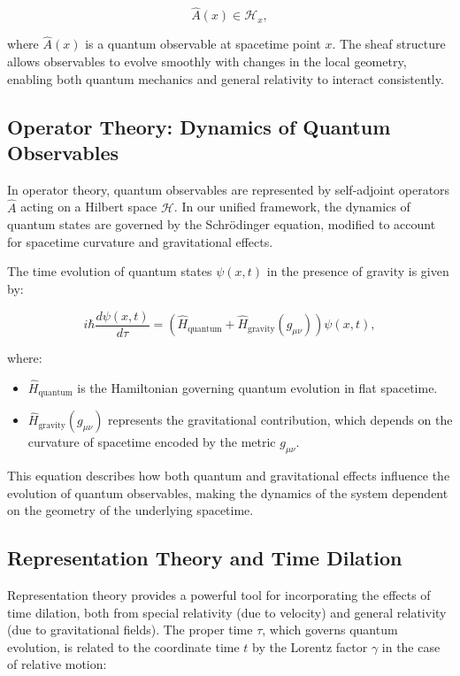 \documentclass{article}
\begin{document}
\[
\hat{A}(x) \in \mathcal{H}_x,
\]

where \( \hat{A}(x) \) is a quantum observable at spacetime point \( x \). The sheaf structure allows observables to evolve smoothly with changes in the local geometry, enabling both quantum mechanics and general relativity to interact consistently.

\subsection{Operator Theory: Dynamics of Quantum Observables}

In operator theory, quantum observables are represented by self-adjoint operators \( \hat{A} \) acting on a Hilbert space \( \mathcal{H} \). In our unified framework, the dynamics of quantum states are governed by the Schrödinger equation, modified to account for spacetime curvature and gravitational effects.

The time evolution of quantum states \( \psi(x, t) \) in the presence of gravity is given by:

\[
i \hbar \frac{d \psi(x, t)}{d \tau} = \left( \hat{H}_{\text{quantum}} + \hat{H}_{\text{gravity}}(g_{\mu\nu}) \right) \psi(x, t),
\]

where:

\begin{itemize}
    \item \( \hat{H}_{\text{quantum}} \) is the Hamiltonian governing quantum evolution in flat spacetime.
    \item \( \hat{H}_{\text{gravity}}(g_{\mu\nu}) \) represents the gravitational contribution, which depends on the curvature of spacetime encoded by the metric \( g_{\mu\nu} \).
\end{itemize}

This equation describes how both quantum and gravitational effects influence the evolution of quantum observables, making the dynamics of the system dependent on the geometry of the underlying spacetime.

\subsection{Representation Theory and Time Dilation}

Representation theory provides a powerful tool for incorporating the effects of time dilation, both from special relativity (due to velocity) and general relativity (due to gravitational fields). The proper time \( \tau \), which governs quantum evolution, is related to the coordinate time \( t \) by the Lorentz factor \( \gamma \) in the case of relative motion:
\end{document}
